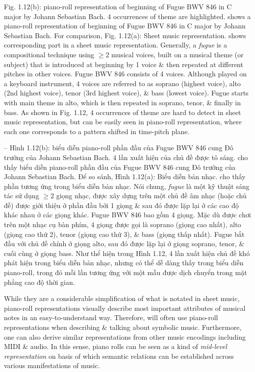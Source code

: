 \documentclass{article}
\begin{document}
\begin{itemize}
\begin{itemize}
\begin{itemize}
			{\sf Fig. 1.12(b): piano-roll representation of beginning of Fugue BWV 846 in C major by {\sc Johann Sebastian Bach}. 4 occurrences of theme are highlighted.} shows a piano-roll representation of beginning of Fugue BWV 846 in C major by {\sc Johann Sebastian Bach}. For comparison, {\sf Fig. 1.12(a): Sheet music representation.} shows corresponding part in a sheet music representation. Generally, a {\it fugue} is a compositional technique using $\ge2$ musical voices, built on a musical theme (or subject) that is introduced at beginning by 1 voice \& then repeated at different pitches in other voices. Fugue BWV 846 consists of 4 voices. Although played on a keyboard instrument, 4 voices are referred to as soprano (highest voice), alto (2nd highest voice), tenor (3rd highest voice), \& bass (lowest voice). Fugue starts with main theme in alto, which is then repeated in soprano, tenor, \& finally in bass. As shown in {\sf Fig. 1.12}, 4 occurrences of theme are hard to detect in sheet music representation, but can be easily seen in piano-roll representation, where each one corresponds to a pattern shifted in time-pitch plane.
			
			-- {\sf Hình 1.12(b): biểu diễn piano-roll phần đầu của Fugue BWV 846 cung Đô trưởng của {\sc Johann Sebastian Bach}. 4 lần xuất hiện của chủ đề được tô sáng.} cho thấy biểu diễn piano-roll phần đầu của Fugue BWV 846 cung Đô trưởng của {\sc Johann Sebastian Bach}. Để so sánh, {\sf Hình 1.12(a): Biểu diễn bản nhạc.} cho thấy phần tương ứng trong biểu diễn bản nhạc. Nói chung, {\it fugue} là một kỹ thuật sáng tác sử dụng $\ge2$ giọng nhạc, được xây dựng trên một chủ đề âm nhạc (hoặc chủ đề) được giới thiệu ở phần đầu bởi 1 giọng \& sau đó được lặp lại ở các cao độ khác nhau ở các giọng khác. Fugue BWV 846 bao gồm 4 giọng. Mặc dù được chơi trên một nhạc cụ bàn phím, 4 giọng được gọi là soprano (giọng cao nhất), alto (giọng cao thứ 2), tenor (giọng cao thứ 3), \& bass (giọng thấp nhất). Fugue bắt đầu với chủ đề chính ở giọng alto, sau đó được lặp lại ở giọng soprano, tenor, \& cuối cùng ở giọng bass. Như thể hiện trong {\sf Hình 1.12}, 4 lần xuất hiện chủ đề khó phát hiện trong biểu diễn bản nhạc, nhưng có thể dễ dàng thấy trong biểu diễn piano-roll, trong đó mỗi lần tương ứng với một mẫu được dịch chuyển trong mặt phẳng cao độ thời gian.
			
			While they are a considerable simplification of what is notated in sheet music, piano-roll representations visually describe most important attributes of musical notes in an easy-to-understand way. Therefore, will often use piano-roll representations when describing \& talking about symbolic music. Furthermore, one can also derive similar representations from other music encodings including MIDI \& audio. In this sense, piano rolls can be seen as a kind of {\it mid-level representation} on basis of which semantic relations can be established across various manifestations of music.
			

\end{itemize}
\end{itemize}
\end{itemize}
\end{document}
